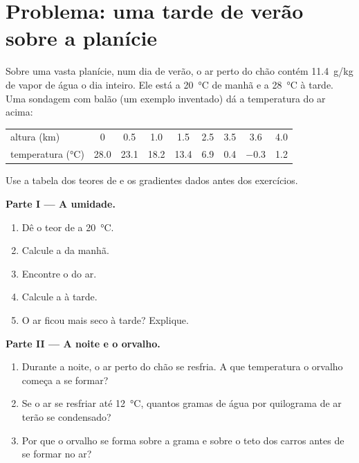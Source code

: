 \section{Problema: uma tarde de verão sobre a planície}

\begin{problem}
\label{pb:g10:why-clouds-form:1}
Sobre uma vasta planície, num dia de verão, o ar perto do chão contém
\qty{11.4}{g/kg} de vapor de água o dia inteiro. Ele está a
\qty{20}{\degreeCelsius} de manhã e a \qty{28}{\degreeCelsius} à tarde. Uma
sondagem com balão (um exemplo inventado) dá a temperatura do ar acima:

\begin{center}
\small
\begin{tabular}{l*{8}{c}}
\hline
altura (km) & 0 & 0.5 & 1.0 & 1.5 & 2.5 & 3.5 & 3.6 & 4.0 \\
temperatura (\unit{\degreeCelsius}) & 28.0 & 23.1 & 18.2 & 13.4 & 6.9 & 0.4 & $-0.3$ & 1.2 \\
\hline
\end{tabular}
\end{center}

\noindent Use a tabela dos teores de  e os gradientes dados antes
dos exercícios.

\medskip
\noindent\textbf{Parte I --- A umidade.}
\begin{enumerate}
  \item Dê o teor de  a \qty{20}{\degreeCelsius}.
  \item Calcule a  da manhã.
  \item Encontre o  do ar.
  \item Calcule a  à tarde.
  \item O ar ficou mais seco à tarde? Explique.
\end{enumerate}

\medskip
\noindent\textbf{Parte II --- A noite e o orvalho.}
\begin{enumerate}[resume]
  \item Durante a noite, o ar perto do chão se resfria. A que temperatura o
        orvalho começa a se formar?
  \item Se o ar se resfriar até \qty{12}{\degreeCelsius}, quantos gramas de
        água por quilograma de ar terão se condensado?
  \item Por que o orvalho se forma sobre a grama e sobre o teto dos carros
        antes de se formar no ar?
\end{enumerate}


\end{problem}
